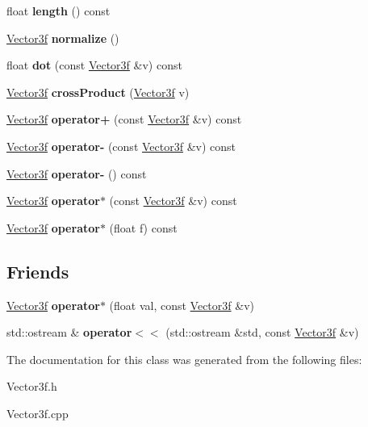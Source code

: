 \begin{DoxyCompactItemize}
float {\bfseries length} () const
\item 
\mbox{\label{class_vector3f_af86f3422d11cfb5e56bdada4b4bc68cc}} 
\mbox{\hyperlink{class_vector3f}{Vector3f}} {\bfseries normalize} ()
\item 
\mbox{\label{class_vector3f_a4ddb5ce190456e116f0715fb72ff9cce}} 
float {\bfseries dot} (const \mbox{\hyperlink{class_vector3f}{Vector3f}} \&v) const
\item 
\mbox{\label{class_vector3f_aeca2c55dc36f17ef3b602f714ae180cc}} 
\mbox{\hyperlink{class_vector3f}{Vector3f}} {\bfseries cross\+Product} (\mbox{\hyperlink{class_vector3f}{Vector3f}} v)
\item 
\mbox{\label{class_vector3f_a914d927662bb2494bd5f5dcc0df57cfa}} 
\mbox{\hyperlink{class_vector3f}{Vector3f}} {\bfseries operator+} (const \mbox{\hyperlink{class_vector3f}{Vector3f}} \&v) const
\item 
\mbox{\label{class_vector3f_a2f5f71db2b48c61bce44e5932cea5125}} 
\mbox{\hyperlink{class_vector3f}{Vector3f}} {\bfseries operator-\/} (const \mbox{\hyperlink{class_vector3f}{Vector3f}} \&v) const
\item 
\mbox{\label{class_vector3f_a64b8be69e77e9af068e6c0cae71b51f2}} 
\mbox{\hyperlink{class_vector3f}{Vector3f}} {\bfseries operator-\/} () const
\item 
\mbox{\label{class_vector3f_a9cb61c27e0ca0fe0ab9f985fb2fe2b22}} 
\mbox{\hyperlink{class_vector3f}{Vector3f}} {\bfseries operator$\ast$} (const \mbox{\hyperlink{class_vector3f}{Vector3f}} \&v) const
\item 
\mbox{\label{class_vector3f_a3146962450ac1e2b990741598f4dc9fc}} 
\mbox{\hyperlink{class_vector3f}{Vector3f}} {\bfseries operator$\ast$} (float f) const
\end{DoxyCompactItemize}
\subsection*{Friends}
\begin{DoxyCompactItemize}
\item 
\mbox{\label{class_vector3f_aa1e7b077412a7dda14250db481497613}} 
\mbox{\hyperlink{class_vector3f}{Vector3f}} {\bfseries operator$\ast$} (float val, const \mbox{\hyperlink{class_vector3f}{Vector3f}} \&v)
\item 
\mbox{\label{class_vector3f_ae11044c18269c8fef450ab53e6cc6290}} 
std\+::ostream \& {\bfseries operator$<$$<$} (std\+::ostream \&std, const \mbox{\hyperlink{class_vector3f}{Vector3f}} \&v)
\end{DoxyCompactItemize}


The documentation for this class was generated from the following files\+:\begin{DoxyCompactItemize}
\item 
Vector3f.\+h\item 
Vector3f.\+cpp\end{DoxyCompactItemize}
